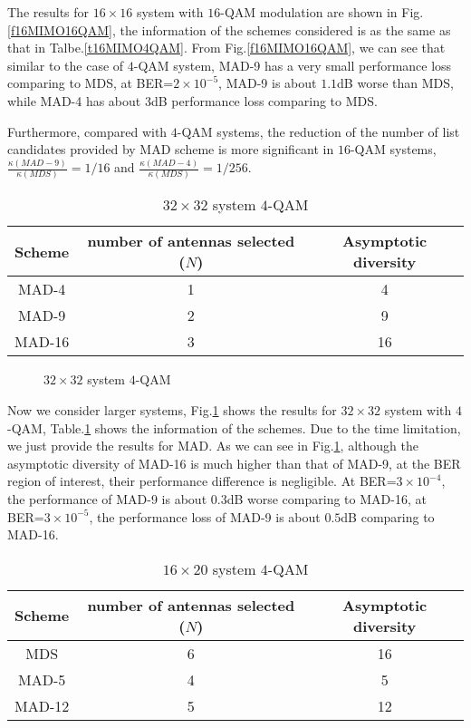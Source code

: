 \documentclass[12pt, draftclsnofoot, onecolumn]{IEEEtran}
\begin{document}
The results for $16\times 16$ system with $16$-QAM modulation are shown in Fig.\ref{f16MIMO16QAM}, the information of the schemes considered is as the same as that in Talbe.\ref{t16MIMO4QAM}. From Fig.\ref{f16MIMO16QAM}, we can see that similar to the case of $4$-QAM system, MAD-9 has a very small performance loss comparing to MDS, at BER=$2\times 10^{-5}$, MAD-9 is about $1.1$dB worse than MDS, while MAD-4 has about $3$dB  performance loss comparing to MDS.

Furthermore, compared with $4$-QAM systems, the reduction of the number of list candidates provided by MAD scheme is more significant in $16$-QAM systems, $\frac{\kappa(MAD-9)}{\kappa(MDS)}=1/16$ and $\frac{\kappa(MAD-4)}{\kappa(MDS)}=1/256$.\newpage

\begin{table}[htb]
\renewcommand{\arraystretch}{1.3}
\caption{$32\times 32$ system $4$-QAM}
\label{t32MIMO4QAM}
\centering
\begin{tabular}{|c|c|c|}
\hline
Scheme&number of antennas selected ($N$)&Asymptotic diversity\\
\hline 
MAD-4&1&4\\
\hline
MAD-9&2&9\\
\hline
MAD-16&3&16\\
\hline
\end{tabular}
\end{table}

\begin{figure}[htb]
\centering
\def\svgwidth{\columnwidth}

\caption{$32\times 32$ system $4$-QAM}
\label{f32MIMO4QAM}
\end{figure}

Now we consider larger systems, Fig.\ref{f32MIMO4QAM} shows the results for $32\times 32$ system with $4$-QAM, Table.\ref{t32MIMO4QAM} shows the information of the schemes. Due to the time limitation, we just provide the results for MAD. As we can see in Fig.\ref{f32MIMO4QAM}, although the asymptotic diversity of MAD-16 is much higher than that of MAD-9, at the BER region of interest, their performance difference is negligible. At BER=$3\times 10^{-4}$, the performance of MAD-9 is about $0.3$dB worse comparing to MAD-16, at BER=$3\times 10^{-5}$, the performance loss of MAD-9 is about $0.5$dB comparing to MAD-16.
\begin{table}[htb]
\renewcommand{\arraystretch}{1.3}
\caption{$16\times 20$ system $4$-QAM}
\label{t1620MIMO4QAM}
\centering
\begin{tabular}{|c|c|c|}
\hline
Scheme&number of antennas selected ($N$)&Asymptotic diversity\\
\hline 
MDS&6&16\\
\hline
MAD-5&4&5\\
\hline
MAD-12&5&12\\
\hline
\end{tabular}
\end{table}
\end{document}
